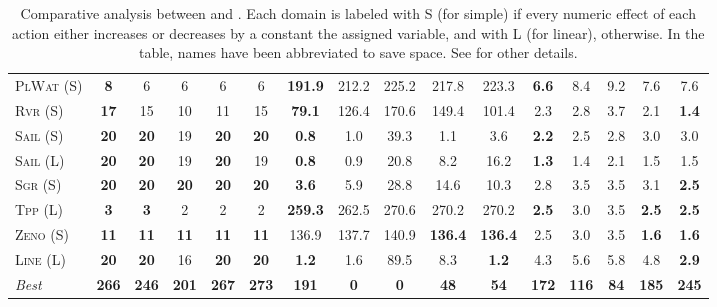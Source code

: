\documentclass[11pt,landscape]{article}
\begin{document}
\begin{table*}[tb]
{\begin{tabular}{|l||ccccc||ccccc||ccccc||}
\textsc{PlWat} (S)&\textbf{8}&6&6&6&6&\textbf{191.9}&212.2&225.2&217.8&223.3&\textbf{6.6}&8.4&9.2&7.6&7.6\\
\textsc{Rvr} (S)&\textbf{17}&15&10&11&15&\textbf{79.1}&126.4&170.6&149.4&101.4&2.3&2.8&3.7&2.1&\textbf{1.4}\\
\textsc{Sail} (S)&\textbf{20}&\textbf{20}&19&\textbf{20}&\textbf{20}&\textbf{0.8}&1.0&39.3&1.1&3.6&\textbf{2.2}&2.5&2.8&3.0&3.0\\
\textsc{Sail} (L)&\textbf{20}&\textbf{20}&19&\textbf{20}&19&\textbf{0.8}&0.9&20.8&8.2&16.2&\textbf{1.3}&1.4&2.1&1.5&1.5\\
\textsc{Sgr} (S)&\textbf{20}&\textbf{20}&\textbf{20}&\textbf{20}&\textbf{20}&\textbf{3.6}&5.9&28.8&14.6&10.3&2.8&3.5&3.5&3.1&\textbf{2.5}\\
\textsc{Tpp} (L)&\textbf{3}&\textbf{3}&2&2&2&\textbf{259.3}&262.5&270.6&270.2&270.2&\textbf{2.5}&3.0&3.5&\textbf{2.5}&\textbf{2.5}\\
\textsc{Zeno} (S)&\textbf{11}&\textbf{11}&\textbf{11}&\textbf{11}&\textbf{11}&136.9&137.7&140.9&\textbf{136.4}&\textbf{136.4}&2.5&3.0&3.5&\textbf{1.6}&\textbf{1.6}\\
\textsc{Line} (L)&\textbf{20}&\textbf{20}&16&\textbf{20}&\textbf{20}&\textbf{1.2}&1.6&89.5&8.3&\textbf{1.2}&4.3&5.6&5.8&4.8&\textbf{2.9}
\\\hline
\textit{Best}&\textbf{266}&\textbf{246}&\textbf{201}&\textbf{267}&\textbf{273}&\textbf{191}&\textbf{0}&\textbf{0}&\textbf{48}&\textbf{54}&\textbf{172}&\textbf{116}&\textbf{84}&\textbf{185}&\textbf{245}\\\hline

        \end{tabular}}
        \caption{Comparative analysis between  \pattya and \pattye. Each domain is labeled with S (for simple) if every numeric effect of each action either increases or decreases by a constant the assigned variable, and with L (for linear), otherwise. In the table, names have been abbreviated to save space.  See \cite{ipc2023} for other details.}
        \label{tab:exp-patty-a-patty-e}
        \end{table*}
        
\end{document}
